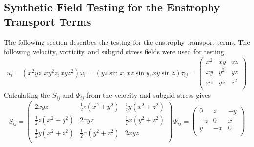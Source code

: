 \subsection{Synthetic Field Testing for the Enstrophy Transport Terms}
The following section describes the testing for the enstrophy transport
terms. The following velocity, vorticity, and subgrid stress fields were
used for testing
\begin{subequations}
    \begin{equation}
        u_{i} =  (x^2 y z, x y^2 z, x y z^2)
    \end{equation}
    \begin{equation}
        \omega_{i} =  (yz\sin x, xz\sin y, xy\sin z)
    \end{equation}
    \begin{equation}
        \tau_{ij} =
        \begin{pmatrix}
            x^2         & xy      &   xz  \\
            xy          & y^2     &   yz  \\
            xz          & yz      &   z^2  \\
        \end{pmatrix}
    \end{equation}
\end{subequations}
Calculating the $S_{ij}$ and $\Psi_{ij}$ from the velocity and subgrid
stress gives
\begin{subequations}
    \begin{equation}
        S_{ij} = 
        \begin{pmatrix}
            2xyz                                        &   \frac{1}{2}z\left(x^{2} + y^{2} \right)     &       \frac{1}{2}y\left(x^{2} + z^{2} \right)     \\
            \frac{1}{2}z\left(x^{2} + y^{2} \right)     &   2xyz                                        &       \frac{1}{2}x\left(y^{2} + z^{2} \right)     \\
            \frac{1}{2}y\left(x^{2} + z^{2} \right)     &   \frac{1}{2}x\left(y^{2} + z^{2} \right)     &       2xyz                                        \\
        \end{pmatrix}
    \end{equation}
    \begin{equation}
        \Psi_{ij} = 
        \begin{pmatrix}
            0           &       z       &           -y      \\
            -z          &       0       &           x       \\
            y           &       -x      &           0       \\
        \end{pmatrix}
    \end{equation}
\end{subequations}
